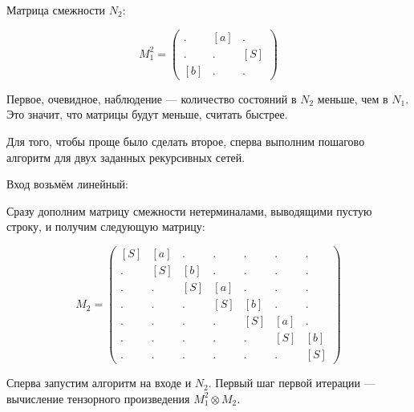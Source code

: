 \begin{example}
Матрица смежности $N_2$:

$$
M_1^2 =
\begin{pmatrix}
.   & [a] & .    \\
.   & .   & [S]  \\
[b] & .   & . 
\end{pmatrix}
$$


Первое, очевидное, наблюдение --- количество состояний в $N_2$ меньше, чем в $N_1$.
Это значит, что матрицы будут меньше, считать быстрее.

Для того, чтобы проще было сделать второе, сперва выполним пошагово алгоритм для двух заданных рекурсивных сетей.

Вход возьмём линейный:
\begin{center}
\end{center}


Сразу дополним матрицу смежности нетерминалами, выводящими пустую строку, и получим следующую матрицу:

$$
M_2 =
\begin{pmatrix}
[S] & [a] & .   & .   & .   & .   & .   \\
.   & [S] & [b] & .   & .   & .   & .   \\
.   & .   & [S] & [a] & .   & .   & .   \\
.   & .   & .   & [S] & [b] & .   & .   \\
.   & .   & .   & .   & [S] & [a] & .   \\
.   & .   & .   & .   & .   & [S] & [b] \\
.   & .   & .   & .   & .   & .   & [S] 
\end{pmatrix}
$$

Сперва запустим алгоритм на входе и $N_2$. 
Первый шаг первой итерации --- вычисление тензорного произведения $M_1^2 \otimes M_2$.


\end{example}
